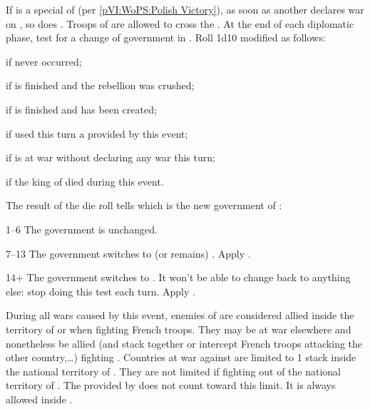\phdipl
\aparag If \payspologne is a special \EG of \FRA (per \ref{pVI:WoPS:Polish
  Victory}), as soon as another \MAJ declares war on \FRA, so does
\payspologne. Troops of \payspologne are allowed to cross the \HRE.
\aparag At the end of each diplomatic phase, test for a change of government
in \paysmajeurFrance. Roll 1d10 modified as follows:
\begin{modlist}
\item[\bonus{-4}] if  never occurred;
\item[\bonus{-2}] if  is finished and the
  rebellion was crushed;
\item[\bonus{+2}] if  is finished and \paysusa
  has been created;
\item[\bonus{+2}] if \FRA used this turn a \CB provided by this event;
\item[\bonus{+4}] if \FRA is at war without declaring any war this turn;
\item[\bonus{+6}] if the king of \FRA died during this event.
\end{modlist}
\aparag The result of the die roll tells which is the new government of \FRA:
\begin{modlist}[2em]
\item[1--6] The government is unchanged.
\item[7--13] The government switches to (or remains)
  \monarqueConvention. Apply .
\item[14+] The government switches to \monarqueTerror. It won't be able to
  change back to anything else: stop doing this test each turn. Apply
  .
\end{modlist}

\phmil
\aparag During all wars caused by this event, enemies of \FRA are considered
allied inside the territory of \FRA or when fighting French troops. They may
be at war elsewhere and nonetheless be allied (and stack together or intercept
French troops attacking the other country,\ldots) fighting \FRA.
\aparag Countries at war against \FRA are limited to 1 stack inside the
national territory of \FRA.
\bparag They are not limited if fighting out of the national territory of
\FRA.
\bparag The \ARMY provided by  does not count
toward this limit. It is always allowed inside \FRA.

